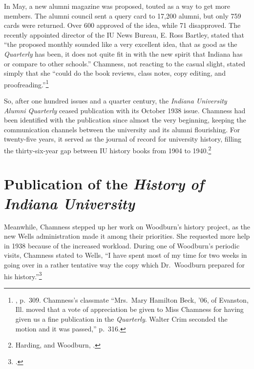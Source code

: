 \documentclass[
  american,
  letterpaper,
]{scrreprt}
\begin{document}
In May, a new alumni magazine was proposed, touted as a way to get more
members. The alumni council sent a query card to 17,200 alumni, but only
759 cards were returned. Over 600 approved of the idea, while 71
disapproved. The recently appointed director of the IU News Bureau, E.
Ross Bartley, stated that ``the proposed monthly sounded like a very
excellent idea, that as good as the \emph{Quarterly} has been, it does
not quite fit in with the new spirit that Indiana has or compare to
other schools.'' Chamness, not reacting to the casual slight, stated
simply that she ``could do the book reviews, class notes, copy editing,
and proofreading.''\footnote{, p.~309. Chamness's classmate ``Mrs.~Mary Hamilton Beck,
  '06, of Evanston, Ill. moved that a vote of appreciation be given to
  Miss Chamness for having given us a fine publication in the
  \emph{Quarterly}. Walter Crim seconded the motion and it was passed,''
  p.~316.}

So, after one hundred issues and a quarter century, the \emph{Indiana
University Alumni Quarterly} ceased publication with its October 1938
issue. Chamness had been identified with the publication since almost
the very beginning, keeping the communication channels between the
university and its alumni flourishing. For twenty-five years, it served
as the journal of record for university history, filling the
thirty-six-year gap between IU history books from 1904 to
1940.\footnote{Harding,  and Woodburn,
  .}

\section{\texorpdfstring{Publication of the \emph{History of Indiana
University}}{Publication of the History of Indiana University}}\label{publication-of-the-history-of-indiana-university}

Meanwhile, Chamness stepped up her work on Woodburn's history project,
as the new Wells administration made it among their priorities. She
requested more help in 1938 because of the increased workload. During
one of Woodburn's periodic visits, Chamness stated to Wells, ``I have
spent most of my time for two weeks in going over in a rather tentative
way the copy which Dr.~Woodburn prepared for his history.''\footnote{.}
\end{document}
